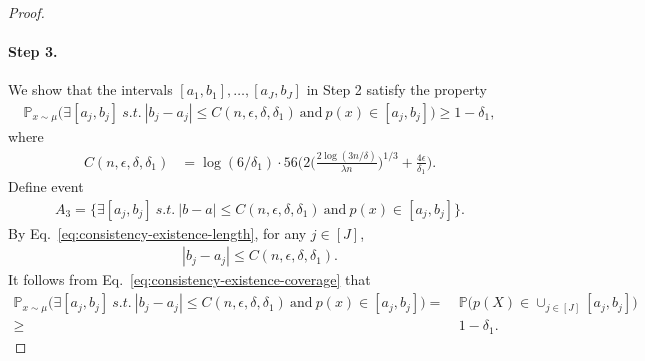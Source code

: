 \documentclass[11pt]{article}
\theoremstyle{statplain}
\theoremstyle{statdefinition}
\newcommand{\PP}{\mathbb{P}}
\newcommand{\0}{\mathbf{0}}
\newcommand{\estModel}{p} %
\begin{document}
\begin{proof}
\paragraph{Step 3. } We show that the intervals $[a_{1},b_{1}],\dots,[a_J,b_J]$ in Step 2 satisfy the property
\begin{align*}
    \PP_{x \sim \mu}\Big(\exists [a_j,b_j]  ~s.t.~ |b_j-a_j| \leq C(n,\epsilon,\delta,\delta_1) ~\text{and}~ p(x) \in [a_j,b_j] \Big) \geq 1-\delta_1,
\end{align*}
where 
\begin{align*}%
    C(n,\epsilon,\delta,\delta_1) &= \log(6/\delta_1) \cdot 56\Big(2\Big(\frac{2\log(3n/\delta)}{\lambda n}\Big)^{1/3}  + \frac{4\epsilon}{\delta_1}\Big).
\end{align*}
Define event
\begin{align*}
    A_3 = \Big\{\exists [a_j,b_j]  ~s.t.~ |b-a| \leq C(n,\epsilon,\delta,\delta_1) ~\text{and}~ p(x) \in [a_j,b_j] \Big\}.
\end{align*}
By Eq.~\eqref{eq:consistency-existence-length}, for any $j \in [J]$,
\begin{align*}
    |b_j-a_j| \leq C(n,\epsilon,\delta,\delta_1).
\end{align*}
It follows from Eq.~\eqref{eq:consistency-existence-coverage} that
\begin{align*}
    \PP_{x \sim \mu}\Big(\exists [a_j,b_j]  ~s.t.~ |b_j-a_j| \leq C(n,\epsilon,\delta,\delta_1) ~\text{and}~ p(x) \in [a_j,b_j] \Big) = &~ \PP\Big(\estModel(X) \in \cup_{j \in [J]} [a_j,b_j]\Big) \\
    \geq &~ 1- \delta_1.
\end{align*}
\end{proof}
\end{document}
